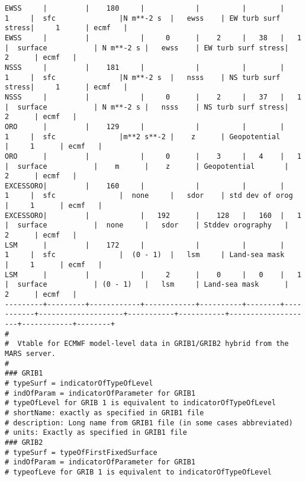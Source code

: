 \documentclass{egu}                  %
\begin{document}
\begin{landscape}
\begin{scriptsize}
\begin{verbatim}
EWSS     |         |    180     |            |          |        |     1     |  sfc               |N m**-2 s  |   ewss    | EW turb surf stress|     1      | ecmf   |
EWSS     |         |            |     0      |    2     |   38   |   1       |  surface           | N m**-2 s |   ewss    | EW turb surf stress|     2      | ecmf   |
NSSS     |         |    181     |            |          |        |     1     |  sfc               |N m**-2 s  |   nsss    | NS turb surf stress|     1      | ecmf   |
NSSS     |         |            |     0      |    2     |   37   |   1       |  surface           | N m**-2 s |   nsss    | NS turb surf stress|     2      | ecmf   |
ORO      |         |    129     |            |          |        |     1     |  sfc               |m**2 s**-2 |    z      | Geopotential       |     1      | ecmf   |
ORO      |         |            |     0      |    3     |   4    |   1       |  surface           |    m      |    z      | Geopotential       |     2      | ecmf   |
EXCESSORO|         |    160     |            |          |        |     1     |  sfc               |  none     |   sdor    | std dev of orog    |     1      | ecmf   |
EXCESSORO|         |            |   192      |    128   |   160  |   1       |  surface           |  none     |   sdor    | Stddev orography   |     2      | ecmf   |
LSM      |         |    172     |            |          |        |     1     |  sfc               |  (0 - 1)  |   lsm     | Land-sea mask      |     1      | ecmf   |
LSM      |         |            |     2      |    0     |   0    |   1       |  surface           | (0 - 1)   |   lsm     | Land-sea mask      |     2      | ecmf   |
---------+---------+------------+------------+----------+--------+-----------+--------------------+-----------+-----------+--------------------+------------+--------+
#
#  Vtable for ECMWF model-level data in GRIB1/GRIB2 hybrid from the MARS server.
#
### GRIB1
# typeSurf = indicatorOfTypeOfLevel
# indOfParam = indicatorOfParameter for GRIB1
# typeOfLevel for GRIB 1 is equivalent to indicatorOfTypeOfLevel
# shortName: exactly as specified in GRIB1 file
# description: Long name from GRIB1 file (in some cases abbreviated)
# units: Exactly as specified in GRIB1 file
### GRIB2
# typeSurf = typeOfFirstFixedSurface
# indOfParam = indicatorOfParameter for GRIB1
# typeofLeve for GRIB 1 is equivalent to indicatorOfTypeOfLevel

\end{verbatim}\end{scriptsize}

\end{landscape} 
\end{document}
